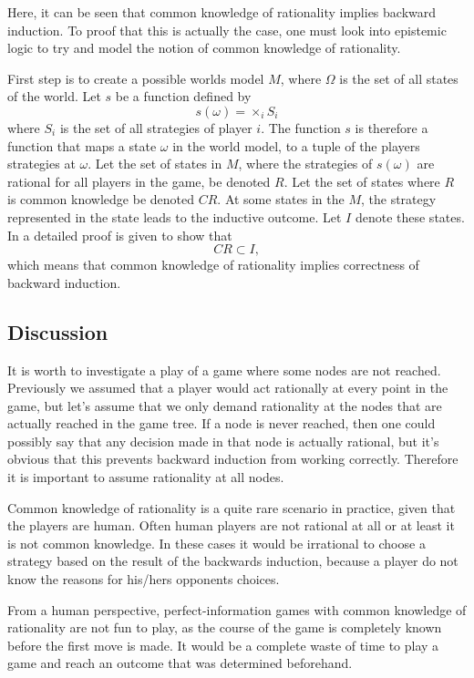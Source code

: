 Here, it can be seen that common knowledge of rationality implies backward induction. To proof that this is actually the case, one must look into epistemic logic to try and model the notion of common knowledge of rationality. 

First step is to create a possible worlds model $M$, where $\Omega$ is the set of all states of the world. 
Let $s$  be a function defined by
$$
s(\omega) = \times_i S_i
$$
where $S_i$ is the set of all strategies of player $i$. The function $s$ is therefore a function that maps a state $\omega$ in the world model, to a tuple of the players strategies at $\omega$.
Let the set of states in $M$, where the strategies of $s(\omega)$ are rational for all players in the game, be denoted $R$. Let the set of states where $R$ is common knowledge be denoted $CR$. At some states in the $M$, the strategy represented in the state leads to the inductive outcome. Let $I$ denote these states.
In \cite{aumann1995a} a detailed proof is given to show that
$$
CR \subset I,
$$
which means that common knowledge of rationality implies correctness of backward induction.

\subsection{Discussion}
It is worth to investigate a play of a game where some nodes are not reached. Previously we assumed that a player would act rationally at every point in the game, but let's assume that we only demand rationality at the nodes that are actually reached in the game tree.
If a node is never reached, then one could possibly say that any decision made in that node is actually rational, but it's obvious that this prevents backward induction from working correctly. Therefore it is important to assume rationality at all nodes.

Common knowledge of rationality is a quite rare scenario in practice, given that the players are human. Often human players are not rational at all or at least it is not common knowledge. In these cases it would be irrational to choose a strategy based on the result of the backwards induction, because a player do not know the reasons for his/hers opponents choices.

From a human perspective, perfect-information games with common knowledge of rationality are not fun to play, as the course of the game is completely known before the first move is made. It would be a complete waste of time to play a game and reach an outcome that was determined beforehand.
